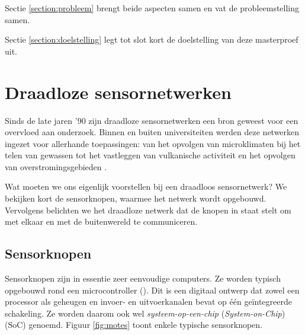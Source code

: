 Sectie \ref{section:probleem} brengt beide aspecten samen en vat de
probleemstelling samen.

Sectie \ref{section:doelstelling} legt tot slot kort de doelstelling van deze
masterproef uit.

\section{Draadloze sensornetwerken}
\label{section:wsn}

Sinds de late jaren '90 zijn draadloze sensornetwerken een bron geweest voor
een overvloed aan onderzoek. Binnen en buiten universiteiten werden deze
netwerken ingezet voor allerhande toepassingen: van het opvolgen van
microklimaten bij het telen van gewassen \citep{baggio2005wireless} tot het
vastleggen van vulkanische activiteit \citep{werner2005monitoring} en het
opvolgen van overstromingsgebieden \citep{hughes2006gridstix}.

Wat moeten we ons eigenlijk voorstellen bij een draadloos sensornetwerk? We
bekijken kort de sensorknopen, waarmee het netwerk wordt opgebouwd. Vervolgens
belichten we het draadloze netwerk dat de knopen in staat stelt om met elkaar
en met de buitenwereld te communiceren.

\subsection{Sensorknopen}

Sensorknopen zijn in essentie zeer eenvoudige computers. Ze worden typisch
opgebouwd rond een microcontroller (\mcu). Dit is een digitaal ontwerp dat
zowel een processor als geheugen en invoer- en uitvoerkanalen bevat op \'e\'en
ge\"integreerde schakeling. Ze worden daarom ook wel \emph{systeem-op-een-chip}
(\emph{System-on-Chip}) (SoC) genoemd. Figuur \ref{fig:motes} toont enkele
typische sensorknopen.

